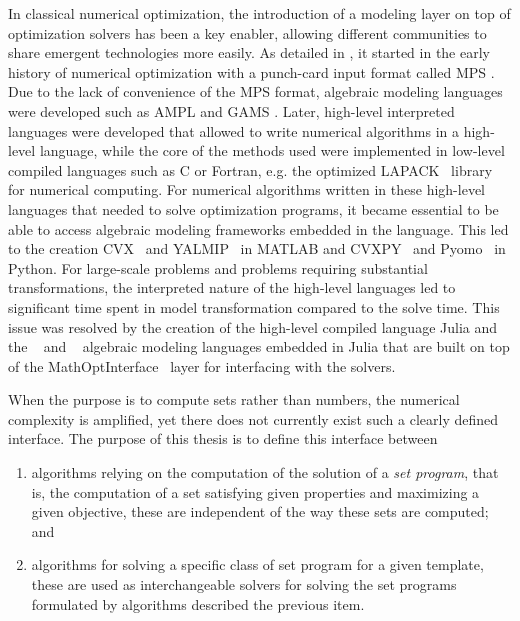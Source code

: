 In classical numerical optimization, the introduction of a modeling layer on top of optimization solvers has been a key enabler,
allowing different communities to share emergent technologies more easily.
As detailed in \cite{orchard-haysHistoryMathematicalProgramming1984}, it started in the early history of numerical optimization with a punch-card input format called MPS \cite{mps_ibm}.
Due to the lack of convenience of the MPS format,
algebraic modeling languages were developed such as AMPL \cite{Fourer1990} and GAMS \cite{brook1988gams}.
Later, high-level interpreted languages were developed that allowed to write numerical
algorithms in a high-level language, while the core of the methods used were implemented
in low-level compiled languages such as C or Fortran, e.g. the optimized LAPACK~\cite{anderson1999lapack} library for numerical computing.
For numerical algorithms written in these high-level languages that needed to
solve optimization programs, it became essential to be able to access algebraic modeling frameworks embedded in the language.
This led to the creation CVX~\cite{grant2014cvx} and YALMIP~\cite{lofberg2004yalmip} in MATLAB\texttrademark{} and CVXPY~\cite{diamond2016cvxpy} and Pyomo~\cite{hart2017pyomo} in Python.
For large-scale problems and problems requiring substantial transformations,
the interpreted nature of the high-level languages led to significant time spent in model transformation compared to the solve time.
This issue was resolved by the creation of the high-level compiled language Julia
and the ~\cite{convexjl} and ~\cite{dunning2017jump} algebraic
modeling languages embedded in Julia that are built on top of
the MathOptInterface~\cite{legat2020mathoptinterfacearXiv} layer for interfacing with the solvers.

When the purpose is to compute sets rather than numbers, the numerical complexity is amplified,
yet there does not currently exist such a clearly defined interface.
The purpose of this thesis is to define this interface between
\begin{enumerate}
  \item algorithms relying on the computation of the solution of a \emph{set program}, that is, the computation of a set satisfying given properties and maximizing a given objective, these are independent of the way these sets are computed; and
  \item algorithms for solving a specific class of set program for a given template,
    these are used as interchangeable solvers for solving the set programs
    formulated by algorithms described the previous item.
\end{enumerate}

